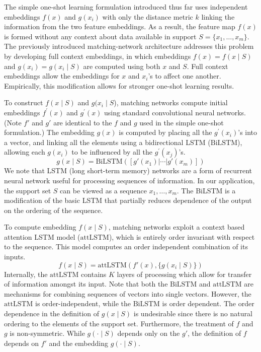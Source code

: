 \documentclass[journal=jacsat,manuscript=article]{achemso}
\begin{document}

The simple one-shot learning formulation introduced thus far uses independent embeddings $f(x)$ and $g(x_i)$ with only the distance metric $k$ linking the information from the two feature embeddings. As a result, the feature map $f(x)$ is formed without any context about data available in support $S = \{x_1,\dotsc, x_m\}$. The previously introduced matching-network architecture \cite{vinyals2016matching} addresses this problem by developing full context embeddings, in which embeddings $f(x)=f(x\mid S)$ and $g(x_i)=g(x_i\mid S)$ are computed using both $x$ and $S$. Full context embeddings allow the embeddings for $x$ and $x_i$'s to affect one another. Empirically, this modification allows for stronger one-shot learning results.

To construct $f(x\mid S)$ and $g(x_i\mid S$), matching networks\cite{vinyals2016matching} compute initial embeddings $f^\prime(x)$ and $g^\prime(x)$ using standard convolutional neural networks. (Note $f'$ and $g'$ are identical to the $f$ and $g$ used in the simple one-shot formulation.) The embedding $g(x)$ is computed by placing all the $g^\prime(x_i)$'s into a vector, and linking all the elements using a bidirectional LSTM \cite{hochreiter1997long, graves2013hybrid} ($\text{BiLSTM}$), allowing each $g(x_i)$ to be influenced by all the $g^\prime(x_j)$'s. 
\[
g(x\mid S) =\text{BiLSTM}([g'(x_1)|\cdots|g'(x_m)])
\]
We note that LSTM (long short-term memory) networks are a form of recurrent neural network useful for processing sequences of information. In our application, the support set $S$ can be viewed as a sequence $x_1,\dotsc, x_m$. The BiLSTM is a modification of the basic LSTM that partially reduces dependence of the output on the ordering of the sequence. 

To compute embedding $f(x\mid S)$, matching networks exploit a context based attention LSTM model \cite{vinyals2015order} ($\text{attLSTM}$), which is entirely order invariant with respect to the sequence. This model computes an order independent combination of its inputs.
\[
f(x\mid S) = \text{attLSTM}(f'(x), \{g(x_i\mid S)\})
\]
Internally, the $\text{attLSTM}$ contains $K$ layers of processing which allow for transfer of information amongst its input. Note that both the $\text{BiLSTM}$ and $\text{attLSTM}$ are mechanisms for combining sequences of vectors into single vectors. However, the $\text{attLSTM}$ is order-independent, while the $\text{BiLSTM}$ is order dependent. The order dependence in the definition of $g(x\mid S)$ is undesirable since there is no natural ordering to the elements of the support set. Furthermore, the treatment of $f$ and $g$ is non-symmetric. While $g(\cdot \mid S)$ depends only on the $g'$, the definition of $f$ depends on $f'$ and the embedding $g(\cdot \mid S)$. %
\end{document}
